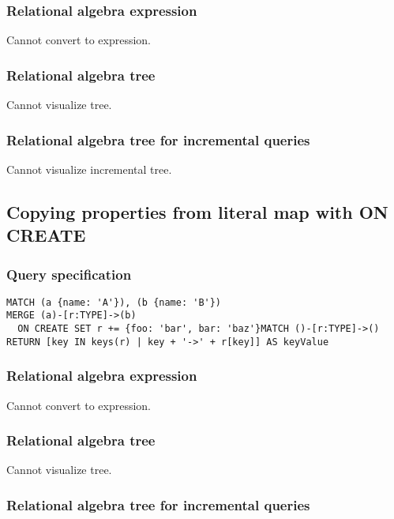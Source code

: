 \subsubsection*{Relational algebra expression}

Cannot convert to expression.

\subsubsection*{Relational algebra tree}

Cannot visualize tree.

\subsubsection*{Relational algebra tree for incremental queries}

Cannot visualize incremental tree.

\subsection{Copying properties from literal map with ON CREATE}

\subsubsection*{Query specification}

\begin{lstlisting}
MATCH (a {name: 'A'}), (b {name: 'B'})
MERGE (a)-[r:TYPE]->(b)
  ON CREATE SET r += {foo: 'bar', bar: 'baz'}MATCH ()-[r:TYPE]->()
RETURN [key IN keys(r) | key + '->' + r[key]] AS keyValue
\end{lstlisting}

\subsubsection*{Relational algebra expression}

Cannot convert to expression.

\subsubsection*{Relational algebra tree}

Cannot visualize tree.

\subsubsection*{Relational algebra tree for incremental queries}

